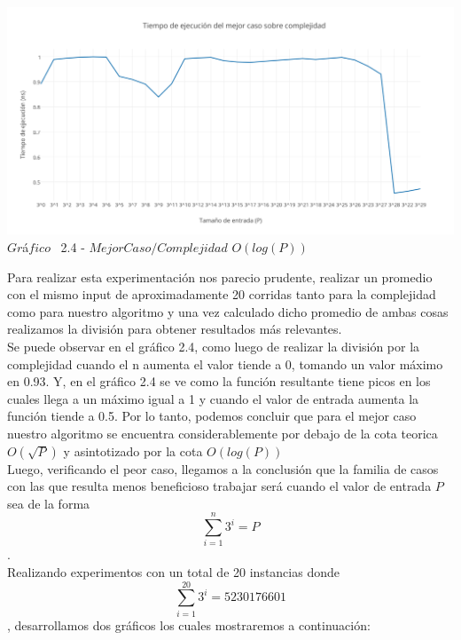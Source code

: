 \vspace*{0.3cm} \vspace*{0.3cm}
  \begin{center}
\includegraphics[scale=0.65]{./EJ2/mejorcaso3.png}
{$Gr$\'a$fico$ \ 2.4 - $Mejor Caso / Complejidad$ $O(log(P))$}
  \end{center}
  \vspace*{0.3cm}

Para realizar esta experimentaci\'on nos parecio prudente, realizar un promedio con el mismo input de aproximadamente 20 corridas
tanto para la complejidad como para nuestro algoritmo y una vez calculado dicho promedio de ambas cosas realizamos la divisi\'on para
obtener resultados m\'as relevantes.\\ 

Se puede observar en el gr\'afico 2.4, como luego de realizar la divisi\'on por la complejidad cuando el n aumenta el valor tiende a 0, tomando un valor m\'aximo en 0.93. Y, en el gr\'afico 2.4 se ve como la funci\'on resultante tiene picos en los cuales llega a un m\'aximo igual a 1 y cuando el valor de entrada aumenta la funci\'on tiende a 0.5. Por lo tanto, podemos concluir que para el mejor caso nuestro algoritmo se encuentra considerablemente por debajo de la cota teorica $O(\sqrt{P})$ y asintotizado por la cota $O(log(P))$\\

Luego, verificando el peor caso, llegamos a la conclusi\'on que la familia de casos con las que resulta menos beneficioso trabajar ser\'a cuando el valor de entrada $P$ sea de la forma \[
\sum_{i=1}^{n}3^{i}=P 
\].
\\

Realizando experimentos con un total de 20 instancias donde \[
\sum_{i=1}^{20}3^{i}=5230176601 
\], desarrollamos dos gr\'aficos los cuales mostraremos a continuaci\'on: \\

